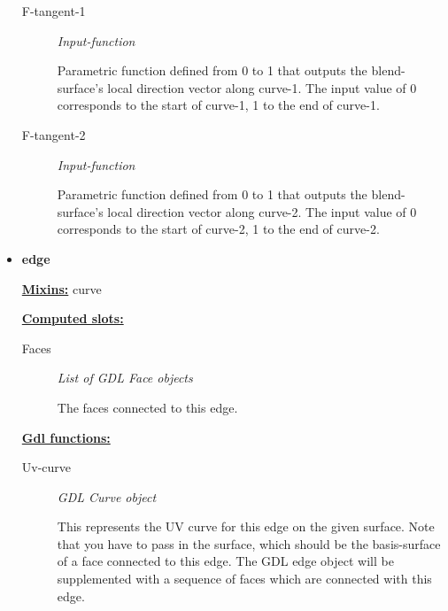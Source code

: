 \documentclass [11pt]{book}
\begin{document}
\begin{itemize}
\begin{description}
\item [F-tangent-1]
\emph{Input-function}

 Parametric function defined from 0 to 1 that outputs the blend-surface's local direction vector along curve-1. The input value of 0 corresponds to the start of curve-1, 1 to the end of curve-1.




\item [F-tangent-2]
\emph{Input-function}

 Parametric function defined from 0 to 1 that outputs the blend-surface's local direction vector along curve-2. The input value of 0 corresponds to the start of curve-2, 1 to the end of curve-2.




\end{description}







\item {}
\label{prim:edge}
\textbf{edge}


\textbf{
\underline{Mixins:}} curve





\textbf{
\underline{Computed slots:}}

\begin{description}

\item [Faces]
\emph{List of GDL Face objects}

 The faces connected to this edge.




\end{description}






\textbf{
\underline{Gdl functions:}}

\begin{description}

\item [Uv-curve]
\emph{GDL Curve object}

 This represents the UV curve for this edge on the given surface.
Note that you  have to pass in the surface, which should be the basis-surface of a face connected
to this edge. The GDL edge object will be supplemented with a sequence of faces which are connected
with this edge.





\end{description}
\end{itemize}
\end{document}
